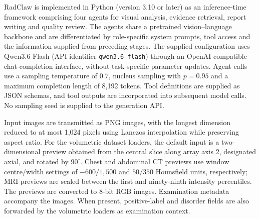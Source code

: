 RadClaw is implemented in Python (version 3.10 or later) as an inference-time framework comprising four agents for visual analysis, evidence retrieval, report writing and quality review. The agents share a pretrained vision--language backbone and are differentiated by role-specific system prompts, tool access and the information supplied from preceding stages. The supplied configuration uses Qwen3.6-Flash (API identifier \texttt{qwen3.6-flash}) through an OpenAI-compatible chat-completion interface, without task-specific parameter updates. Agent calls use a sampling temperature of 0.7, nucleus sampling with $p=0.95$ and a maximum completion length of 8,192 tokens. Tool definitions are supplied as JSON schemas, and tool outputs are incorporated into subsequent model calls. No sampling seed is supplied to the generation API.

Input images are transmitted as PNG images, with the longest dimension reduced to at most 1,024 pixels using Lanczos interpolation while preserving aspect ratio. For the volumetric dataset loaders, the default input is a two-dimensional preview obtained from the central slice along array axis 2, designated axial, and rotated by $90^{\circ}$. Chest and abdominal CT previews use window centre/width settings of $-600/1{,}500$ and $50/350$ Hounsfield units, respectively; MRI previews are scaled between the first and ninety-ninth intensity percentiles. The previews are converted to 8-bit RGB images. Examination metadata accompany the images. When present, positive-label and disorder fields are also forwarded by the volumetric loaders as examination context.

